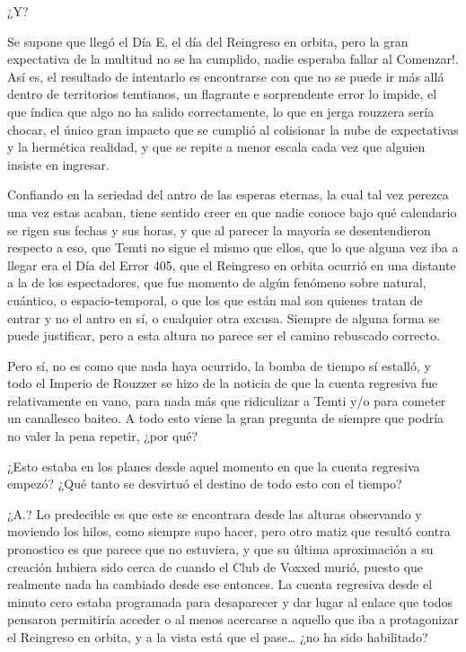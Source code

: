 \documentclass[
  spanish,
]{book}
\begin{document}
¿Y?

Se supone que llegó el Día E, el día del Reingreso en orbita, pero la gran expectativa de la multitud no se ha cumplido, nadie esperaba fallar al Comenzar!. Así es, el resultado de intentarlo es encontrarse con que no se puede ir más allá dentro de territorios temtianos, un flagrante e sorprendente error lo impide, el que índica que algo no ha salido correctamente, lo que en jerga rouzzera sería chocar, el único gran impacto que se cumplió al colisionar la nube de expectativas y la hermética realidad, y que se repite a menor escala cada vez que alguien insiste en ingresar.

Confiando en la seriedad del antro de las esperas eternas, la cual tal vez perezca una vez estas acaban, tiene sentido creer en que nadie conoce bajo qué calendario se rigen sus fechas y sus horas, y que al parecer la mayoría se desentendieron respecto a eso, que Temti no sigue el mismo que ellos, que lo que alguna vez iba a llegar era el Día del Error 405, que el Reingreso en orbita ocurrió en una distante a la de los espectadores, que fue momento de algún fenómeno sobre natural, cuántico, o espacio-temporal, o que los que están mal son quienes tratan de entrar y no el antro en sí, o cualquier otra excusa. Siempre de alguna forma se puede justificar, pero a esta altura no parece ser el camino rebuscado correcto.

Pero sí, no es como que nada haya ocurrido, la bomba de tiempo sí estalló, y todo el Imperio de Rouzzer se hizo de la noticia de que la cuenta regresiva fue relativamente en vano, para nada más que ridiculizar a Temti y/o para cometer un canallesco baiteo. A todo esto viene la gran pregunta de siempre que podría no valer la pena repetir, ¿por qué?

¿Esto estaba en los planes desde aquel momento en que la cuenta regresiva empezó? ¿Qué tanto se desvirtuó el destino de todo esto con el tiempo?

¿A.? Lo predecible es que este se encontrara desde las alturas observando y moviendo los hilos, como siempre supo hacer, pero otro matiz que resultó contra pronostico es que parece que no estuviera, y que su última aproximación a su creación hubiera sido cerca de cuando el Club de Voxxed murió, puesto que realmente nada ha cambiado desde ese entonces. La cuenta regresiva desde el minuto cero estaba programada para desaparecer y dar lugar al enlace que todos pensaron permitiría acceder o al menos acercarse a aquello que iba a protagonizar el Reingreso en orbita, y a la vista está que el pase\ldots{} ¿no ha sido habilitado?
\end{document}

